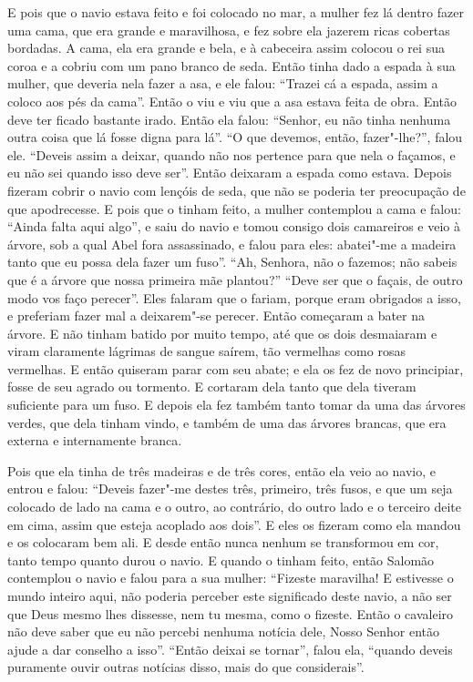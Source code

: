 E pois que o navio estava feito e foi colocado no mar, a mulher fez lá dentro
fazer uma cama, que era grande e maravilhosa, e fez sobre ela jazerem ricas
cobertas bordadas. A cama, ela era grande e bela, e à cabeceira assim colocou o
rei sua coroa e a cobriu com um pano branco de seda. Então tinha dado a espada
à sua mulher, que deveria nela fazer a asa, e ele falou: “Trazei cá a espada,
assim a coloco aos pés da cama”. Então o viu e viu que a asa estava feita de
obra. Então deve ter ficado bastante irado. Então ela falou: “Senhor, eu não
tinha nenhuma outra coisa que lá fosse digna para lá”. “O que devemos, então,
fazer"-lhe?”, falou ele. “Deveis assim a deixar, quando não nos pertence para
que nela o façamos, e eu não sei quando isso deve ser”. Então deixaram a espada
como estava. Depois fizeram cobrir o navio com lençóis de seda, que não se
poderia ter preocupação de que apodrecesse. E pois que o tinham feito, a mulher
contemplou a cama e falou: “Ainda falta aqui algo”, e saiu do navio e tomou
consigo dois camareiros e veio à árvore, sob a qual Abel fora assassinado, e
falou para eles: abatei"-me a madeira tanto que eu possa dela fazer um fuso”.
“Ah, Senhora, não o fazemos; não sabeis que é a árvore que nossa primeira mãe
plantou?” “Deve ser que o façais, de outro modo vos faço perecer”. Eles
falaram que o fariam, porque eram obrigados a isso, e preferiam fazer mal a
deixarem"-se perecer. Então começaram a bater na árvore. E não tinham batido por
muito tempo, até que os dois desmaiaram e viram claramente lágrimas de sangue
saírem, tão vermelhas como rosas vermelhas. E então quiseram parar com seu
abate; e ela os fez de novo principiar, fosse de seu agrado ou tormento. E
cortaram dela tanto que dela tiveram suficiente para um fuso. E depois ela fez
também tanto tomar da uma das árvores verdes, que dela tinham vindo, e também
de uma das árvores brancas, que era externa e internamente branca.

Pois que ela tinha de três madeiras e de três cores, então ela veio ao navio, e
entrou e falou: “Deveis fazer"-me destes três, primeiro, três fusos, e que um
seja colocado de lado na cama e o outro, ao contrário, do outro lado e o
terceiro deite em cima, assim que esteja acoplado aos dois”. E eles os fizeram
como ela mandou e os colocaram bem ali. E desde então nunca nenhum se
transformou em cor, tanto tempo quanto durou o navio. E quando o tinham feito,
então Salomão contemplou o navio e falou para a sua mulher: “Fizeste maravilha!
E estivesse o mundo inteiro aqui, não poderia perceber este significado deste
navio, a não ser que Deus mesmo lhes dissesse, nem tu mesma, como o fizeste.
Então o cavaleiro não deve saber que eu não percebi nenhuma notícia dele, Nosso
Senhor então ajude a dar conselho a isso”. “Então deixai se tornar”, falou ela,
“quando deveis puramente ouvir outras notícias disso, mais do que considerais”.


